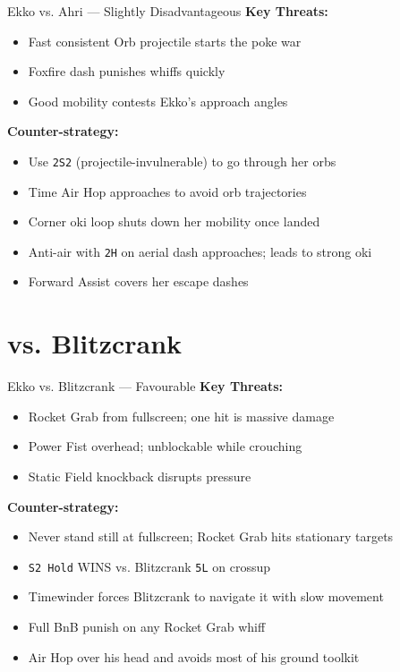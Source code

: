 \documentclass[12pt, a4paper]{report}
\newcommand{\notation}[1]{{\small\texttt{\textcolor{ekkoBlue}{#1}}}}
\newcommand{\champ}[1]{\textcolor{ekkoAccent}{\textbf{#1}}}
\begin{document}
\begin{matchupbox}[]{Ekko vs. Ahri --- Slightly Disadvantageous}
\textbf{Key Threats:}
\begin{itemize}
  \item Fast consistent Orb projectile starts the poke war
  \item Foxfire dash punishes whiffs quickly
  \item Good mobility contests Ekko's approach angles
\end{itemize}
\textbf{Counter-strategy:}
\begin{itemize}
  \item Use \notation{2S2} (projectile-invulnerable) to go through her orbs
  \item Time Air Hop approaches to avoid orb trajectories
  \item Corner oki loop shuts down her mobility once landed
  \item Anti-air with \notation{2H} on aerial dash approaches; leads to strong oki
  \item Forward Assist covers her escape dashes
\end{itemize}
\end{matchupbox}

\section{vs. \champ{Blitzcrank}}

\begin{matchupbox}[]{Ekko vs. Blitzcrank --- Favourable}
\textbf{Key Threats:}
\begin{itemize}
  \item Rocket Grab from fullscreen; one hit is massive damage
  \item Power Fist overhead; unblockable while crouching
  \item Static Field knockback disrupts pressure
\end{itemize}
\textbf{Counter-strategy:}
\begin{itemize}
  \item Never stand still at fullscreen; Rocket Grab hits stationary targets
  \item \notation{S2 Hold} WINS vs. Blitzcrank \notation{5L} on crossup
  \item Timewinder forces Blitzcrank to navigate it with slow movement
  \item Full BnB punish on any Rocket Grab whiff
  \item Air Hop over his head and avoids most of his ground toolkit
\end{itemize}
\end{matchupbox}
\end{document}
